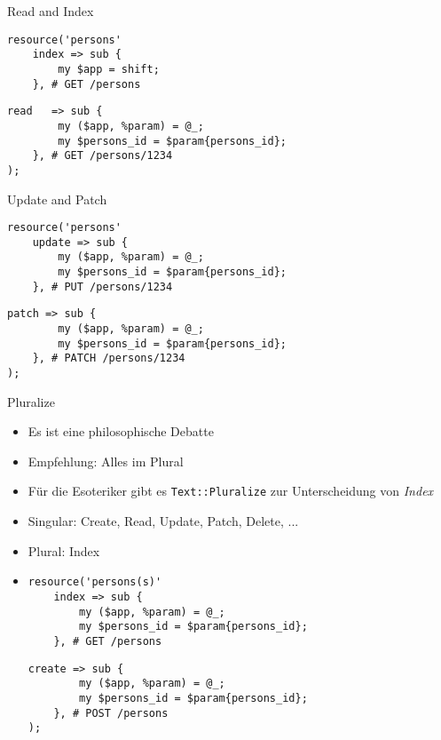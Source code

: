 
\begin{frame}[fragile]{Read and Index}

\begin{lstlisting}
resource('persons'
    index => sub {
        my $app = shift;
    }, # GET /persons
\end{lstlisting}\pause\begin{lstlisting}[firstnumber=last]
    read   => sub {
        my ($app, %param) = @_;
        my $persons_id = $param{persons_id};
    }, # GET /persons/1234
);
\end{lstlisting}
\end{frame}


\begin{frame}[fragile]{Update and Patch}

\begin{lstlisting}
resource('persons'
    update => sub {
        my ($app, %param) = @_;
        my $persons_id = $param{persons_id};
    }, # PUT /persons/1234
\end{lstlisting}\pause\begin{lstlisting}[firstnumber=last]
    patch => sub {
        my ($app, %param) = @_;
        my $persons_id = $param{persons_id};
    }, # PATCH /persons/1234
);
\end{lstlisting}
\end{frame}


\begin{frame}[fragile]{Pluralize}

\begin{itemize}
    \item Es ist eine philosophische Debatte
    \pause
    \item Empfehlung: Alles im Plural
    \pause
    \item Für die Esoteriker gibt es \texttt{Text::Pluralize} zur Unterscheidung von \textit{Index}
    \pause
    \item Singular: Create, Read, Update, Patch, Delete, ...
    \pause
    \item Plural: Index
    \pause
    \item[]
\begin{lstlisting}
resource('persons(s)'
    index => sub {
        my ($app, %param) = @_;
        my $persons_id = $param{persons_id};
    }, # GET /persons
\end{lstlisting}\pause\begin{lstlisting}[firstnumber=last]
    create => sub {
        my ($app, %param) = @_;
        my $persons_id = $param{persons_id};
    }, # POST /persons
);
\end{lstlisting}
\end{itemize}
\end{frame}

